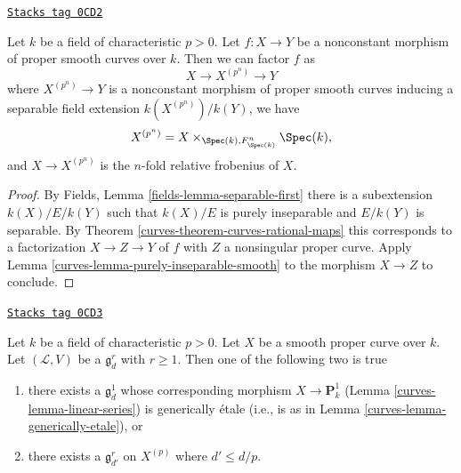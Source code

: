 \begin{proposition}
\label{curves-proposition-unwind-morphism-smooth}
\href{https://stacks.math.columbia.edu/tag/0CD2}{\texttt{Stacks tag 0CD2}}

Let $k$ be a field of characteristic $p > 0$. Let $f : X \to Y$ be a
nonconstant morphism of proper smooth curves over $k$.
Then we can factor $f$ as
$$
X \longrightarrow X^{(p^n)} \longrightarrow Y
$$
where $X^{(p^n)} \to Y$ is a nonconstant morphism of proper smooth curves
inducing a separable field extension $k(X^{(p^n)})/k(Y)$, we have
$$
X^{(p^n)} = X \times_{\Spec(k), F_{\Spec(k)}^n} \Spec(k),
$$
and $X \to X^{(p^n)}$ is the $n$-fold relative frobenius of $X$.
\end{proposition}

\begin{proof}

By Fields, Lemma \ref{fields-lemma-separable-first}
there is a subextension $k(X)/E/k(Y)$ such that
$k(X)/E$ is purely inseparable and $E/k(Y)$ is separable.
By Theorem \ref{curves-theorem-curves-rational-maps}
this corresponds to a factorization
$X \to Z \to Y$ of $f$ with $Z$ a nonsingular proper curve.
Apply Lemma \ref{curves-lemma-purely-inseparable-smooth}
to the morphism $X \to Z$ to conclude.
\end{proof}

\begin{lemma}
\label{curves-lemma-inseparable-linear-system}
\href{https://stacks.math.columbia.edu/tag/0CD3}{\texttt{Stacks tag 0CD3}}

Let $k$ be a field of characteristic $p > 0$. Let $X$ be a smooth proper
curve over $k$. Let $(\mathcal{L}, V)$ be a $\mathfrak g^r_d$ with $r \geq 1$.
Then one of the following two is true
\begin{enumerate}
\item there exists a $\mathfrak g^1_d$ whose corresponding morphism
$X \to \mathbf{P}^1_k$ (Lemma \ref{curves-lemma-linear-series})
is generically \'etale (i.e., is as in Lemma \ref{curves-lemma-generically-etale}), or
\item there exists a $\mathfrak g^r_{d'}$ on $X^{(p)}$ where
$d' \leq d/p$.
\end{enumerate}
\end{lemma}

